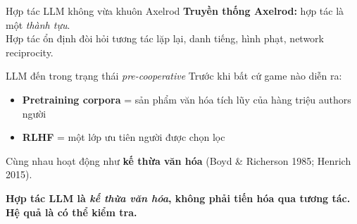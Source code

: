 \documentclass[11pt,aspectratio=169]{beamer}
\newcommand{\takeaway}[1]{%
  \begin{center}
    \colorbox{rsnavy!10}{%
      \begin{minipage}{0.92\textwidth}
        \centering\textbf{#1}
      \end{minipage}}
  \end{center}}
\begin{document}
\begin{frame}{Hợp tác LLM không vừa khuôn Axelrod}
    \large
    \textbf{Truyền thống Axelrod:} hợp tác là một \emph{thành tựu}.\\
    Hợp tác ổn định đòi hỏi tương tác lặp lại, danh tiếng, hình phạt, network reciprocity.
    \vspace{0.3cm}
    \begin{block}{LLM đến trong trạng thái \emph{pre-cooperative}}
        Trước khi bất cứ game nào diễn ra:
        \begin{itemize}
            \setlength\itemsep{0.2em}
            \item \textbf{Pretraining corpora} = sản phẩm văn hóa tích lũy của hàng triệu authors người
            \item \textbf{RLHF} = một lớp ưu tiên người được chọn lọc
        \end{itemize}
        \vspace{0.2cm}
        Cùng nhau hoạt động như \textbf{kế thừa văn hóa} (Boyd \& Richerson 1985; Henrich 2015).
    \end{block}
    \vspace{0.3cm}
    \takeaway{Hợp tác LLM là \emph{kế thừa văn hóa}, không phải tiến hóa qua tương tác. Hệ quả là có thể kiểm tra.}
\end{frame}
\end{document}
